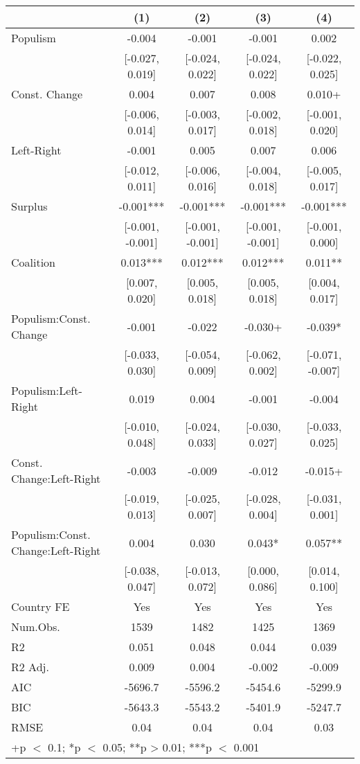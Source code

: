 \begin{table}
\centering\centering\centering
\begin{tabular}[t]{lcccc}
\toprule
  & (1) & (2) & (3) & (4)\\
\midrule
Populism & -0.004 & -0.001 & -0.001 & 0.002\\
 & {}[-0.027, 0.019] & {}[-0.024, 0.022] & {}[-0.024, 0.022] & {}[-0.022, 0.025]\\
Const. Change & 0.004 & 0.007 & 0.008 & 0.010+\\
 & {}[-0.006, 0.014] & {}[-0.003, 0.017] & {}[-0.002, 0.018] & {}[-0.001, 0.020]\\
Left-Right & -0.001 & 0.005 & 0.007 & 0.006\\
 & {}[-0.012, 0.011] & {}[-0.006, 0.016] & {}[-0.004, 0.018] & {}[-0.005, 0.017]\\
Surplus & -0.001*** & -0.001*** & -0.001*** & -0.001***\\
 & {}[-0.001, -0.001] & {}[-0.001, -0.001] & {}[-0.001, -0.001] & {}[-0.001, 0.000]\\
Coalition & 0.013*** & 0.012*** & 0.012*** & 0.011**\\
 & {}[0.007, 0.020] & {}[0.005, 0.018] & {}[0.005, 0.018] & {}[0.004, 0.017]\\
Populism:Const. Change & -0.001 & -0.022 & -0.030+ & -0.039*\\
 & {}[-0.033, 0.030] & {}[-0.054, 0.009] & {}[-0.062, 0.002] & {}[-0.071, -0.007]\\
Populism:Left-Right & 0.019 & 0.004 & -0.001 & -0.004\\
 & {}[-0.010, 0.048] & {}[-0.024, 0.033] & {}[-0.030, 0.027] & {}[-0.033, 0.025]\\
Const. Change:Left-Right & -0.003 & -0.009 & -0.012 & -0.015+\\
 & {}[-0.019, 0.013] & {}[-0.025, 0.007] & {}[-0.028, 0.004] & {}[-0.031, 0.001]\\
Populism:Const. Change:Left-Right & 0.004 & 0.030 & 0.043* & 0.057**\\
 & {}[-0.038, 0.047] & {}[-0.013, 0.072] & {}[0.000, 0.086] & {}[0.014, 0.100]\\
\midrule
Country FE & Yes & Yes & Yes & Yes\\
Num.Obs. & 1539 & 1482 & 1425 & 1369\\
R2 & 0.051 & 0.048 & 0.044 & 0.039\\
R2 Adj. & 0.009 & 0.004 & -0.002 & -0.009\\
AIC & -5696.7 & -5596.2 & -5454.6 & -5299.9\\
BIC & -5643.3 & -5543.2 & -5401.9 & -5247.7\\
RMSE & 0.04 & 0.04 & 0.04 & 0.03\\
\bottomrule
\multicolumn{5}{l}{\rule{0pt}{1em}+p $<$ 0.1; *p $<$ 0.05; **p > 0.01; ***p $<$ 0.001}\\
\end{tabular}
\end{table}
